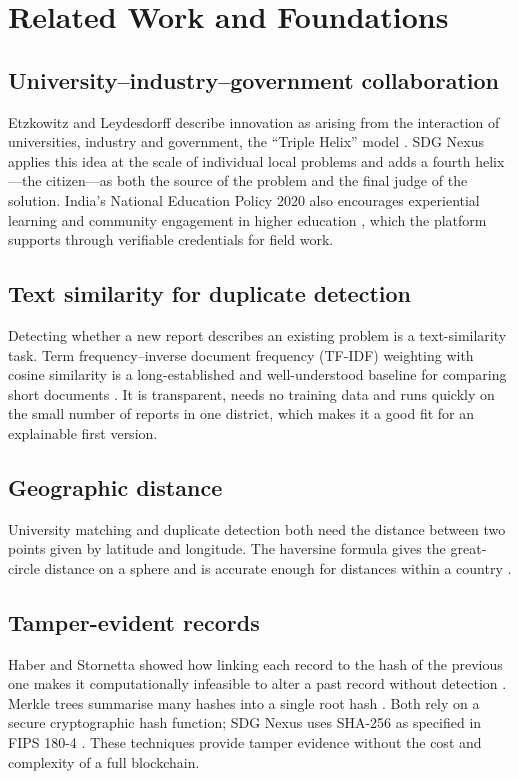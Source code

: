 \section{Related Work and Foundations}

\subsection*{University--industry--government collaboration}
Etzkowitz and Leydesdorff describe innovation as arising from the interaction of universities, industry and government, the ``Triple Helix'' model \cite{etzkowitz2000}. SDG Nexus applies this idea at the scale of individual local problems and adds a fourth helix---the citizen---as both the source of the problem and the final judge of the solution. India's National Education Policy 2020 also encourages experiential learning and community engagement in higher education \cite{nep2020}, which the platform supports through verifiable credentials for field work.

\subsection*{Text similarity for duplicate detection}
Detecting whether a new report describes an existing problem is a text-similarity task. Term frequency--inverse document frequency (TF-IDF) weighting with cosine similarity is a long-established and well-understood baseline for comparing short documents \cite{salton1988}. It is transparent, needs no training data and runs quickly on the small number of reports in one district, which makes it a good fit for an explainable first version.

\subsection*{Geographic distance}
University matching and duplicate detection both need the distance between two points given by latitude and longitude. The haversine formula gives the great-circle distance on a sphere and is accurate enough for distances within a country \cite{sinnott1984}.

\subsection*{Tamper-evident records}
Haber and Stornetta showed how linking each record to the hash of the previous one makes it computationally infeasible to alter a past record without detection \cite{haber1991}. Merkle trees summarise many hashes into a single root hash \cite{merkle1987}. Both rely on a secure cryptographic hash function; SDG Nexus uses SHA-256 as specified in FIPS 180-4 \cite{fips180}. These techniques provide tamper evidence without the cost and complexity of a full blockchain.

